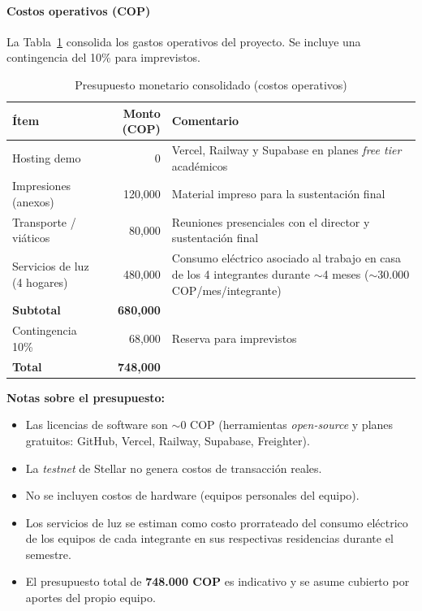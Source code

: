 \documentclass[12pt,oneside]{report}
\begin{document}
      \paragraph{Costos operativos (COP)}
      La Tabla~\ref{tab:costos-operativos} consolida los gastos operativos del proyecto. Se incluye una contingencia del 10\% para imprevistos.

      \begin{table}[H]
        \centering
        \begin{tabular}{@{}p{4.8cm} r p{6.0cm}@{}}
          \toprule
          \textbf{Ítem} & \textbf{Monto (COP)} & \textbf{Comentario}\\
          \midrule
          Hosting demo & 0 & Vercel, Railway y Supabase en planes \textit{free tier} académicos\\
          Impresiones (anexos) & 120{,}000 & Material impreso para la sustentación final\\
          Transporte / viáticos & 80{,}000 & Reuniones presenciales con el director y sustentación final\\
          Servicios de luz (4 hogares) & 480{,}000 & Consumo eléctrico asociado al trabajo en casa de los 4 integrantes durante $\sim$4 meses ($\sim$30.000 COP/mes/integrante)\\
          \midrule
          \textbf{Subtotal} & \textbf{680{,}000} & \\
          Contingencia 10\% & 68{,}000 & Reserva para imprevistos\\
          \midrule
          \textbf{Total} & \textbf{748{,}000} & \\
          \bottomrule
        \end{tabular}
        \caption{Presupuesto monetario consolidado (costos operativos)}
        \label{tab:costos-operativos}
      \end{table}

      \textbf{Notas sobre el presupuesto:}
      \begin{itemize}
        \item Las licencias de software son $\sim$0 COP (herramientas \textit{open-source} y planes gratuitos: GitHub, Vercel, Railway, Supabase, Freighter).
        \item La \textit{testnet} de Stellar no genera costos de transacción reales.
        \item No se incluyen costos de hardware (equipos personales del equipo).
        \item Los servicios de luz se estiman como costo prorrateado del consumo eléctrico de los equipos de cada integrante en sus respectivas residencias durante el semestre.
        \item El presupuesto total de \textbf{748.000 COP} es indicativo y se asume cubierto por aportes del propio equipo.
      \end{itemize}
\end{document}
